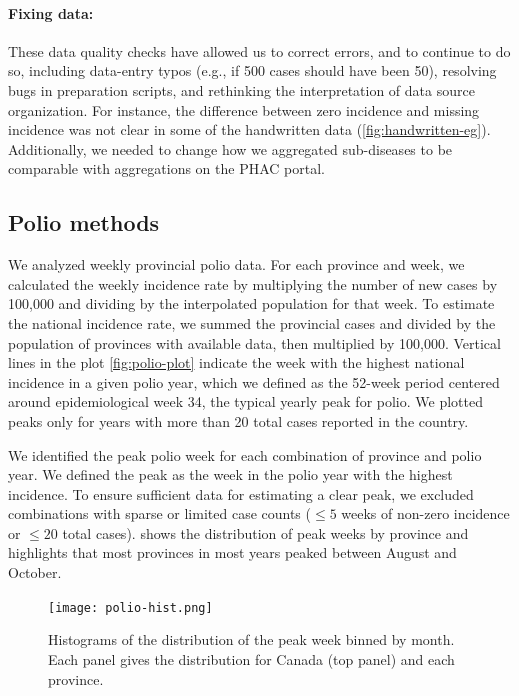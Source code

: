 \documentclass[12pt]{article}
\begin{document}
\paragraph{Fixing data:} These data quality checks have allowed us to correct errors, and to continue to do so, including data-entry typos (e.g., if 500 cases should have been 50), resolving bugs in preparation scripts, and rethinking the interpretation of data source organization. For instance, the difference between zero incidence and missing incidence was not clear in some of the handwritten data (\cref{fig:handwritten-eg}). Additionally, we needed to change how we aggregated sub-diseases to be comparable with aggregations on the PHAC portal.

\subsection{Polio methods}\label{sec:appendix-polio}

We analyzed weekly provincial polio data. For each province and week, we calculated the weekly incidence rate by multiplying the number of new cases by 100,000 and dividing by the interpolated population for that week. To estimate the national incidence rate, we summed the provincial cases and divided by the population of provinces with available data, then multiplied by 100,000. Vertical lines in the plot \cref{fig:polio-plot} indicate the week with the highest national incidence in a given polio year, which we defined as the 52-week period centered around epidemiological week 34, the typical yearly peak for polio. We plotted peaks only for years with more than 20 total cases reported in the country.

We identified the peak polio week for each combination of province and polio year. We defined the peak as the week in the polio year with the highest incidence. To ensure sufficient data for estimating a clear peak, we excluded combinations with sparse or limited case counts ($\le 5$ weeks of non-zero incidence or $\le 20$ total cases).  shows the distribution of peak weeks by province and highlights that most provinces in most years peaked between August and October.

\begin{figure}
\texttt{[image: polio-hist.png]}
\caption{Histograms of the distribution of the peak week binned by month.
Each panel gives the distribution for Canada (top panel) and each province.}\label{fig:polio-peak-month}
\end{figure}
\end{document}
